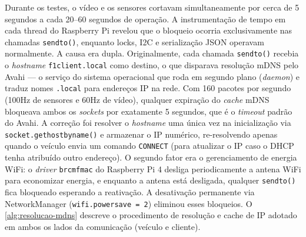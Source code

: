 Durante os testes, o vídeo e os sensores cortavam simultaneamente por cerca de 5 segundos a cada 20--60 segundos de operação. A instrumentação de tempo em cada thread do Raspberry Pi revelou que o bloqueio ocorria exclusivamente nas chamadas \texttt{sendto()}, enquanto locks, \gls{I2C} e serialização \gls{JSON} operavam normalmente. A causa era dupla. Originalmente, cada chamada \texttt{sendto()} recebia o \textit{hostname} \texttt{f1client.local} como destino, o que disparava resolução \gls{mDNS} pelo Avahi --- o serviço do sistema operacional que roda em segundo plano (\textit{daemon}) e traduz nomes \texttt{.local} para endereços IP na rede. Com 160 pacotes por segundo (100Hz de sensores e 60Hz de vídeo), qualquer expiração do \textit{cache} \gls{mDNS} bloqueava ambos os \textit{sockets} por exatamente 5 segundos, que é o \textit{timeout} padrão do Avahi. A correção foi resolver o \textit{hostname} uma única vez na inicialização via \texttt{socket.gethostbyname()} e armazenar o \gls{IP} numérico, re-resolvendo apenas quando o veículo envia um comando \texttt{CONNECT} (para atualizar o \gls{IP} caso o \gls{DHCP} tenha atribuído outro endereço). O segundo fator era o gerenciamento de energia WiFi: o \textit{driver} \texttt{brcmfmac} do Raspberry Pi 4 desliga periodicamente a antena WiFi para economizar energia, e enquanto a antena está desligada, qualquer \texttt{sendto()} fica bloqueado esperando a reativação. A desativação permanente via NetworkManager (\texttt{wifi.powersave = 2}) eliminou esses bloqueios. O \autoref{alg:resolucao-mdns} descreve o procedimento de resolução e cache de IP adotado em ambos os lados da comunicação (veículo e cliente).

\begin{algorithm}[h!]
	\SetSpacedAlgorithm
	\caption{\label{alg:resolucao-mdns}Resolução \gls{mDNS} com cache de \gls{IP}}
\end{algorithm}


